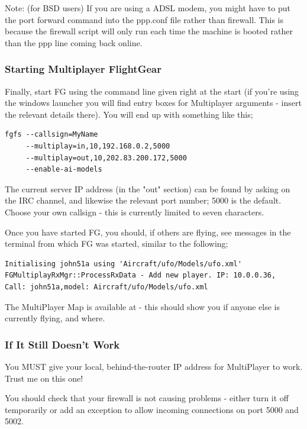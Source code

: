 Note: (for BSD users) If you are using a ADSL modem, you might have to put the port forward command into the ppp.conf 
file rather than firewall. This is because the firewall script will only run each time the machine is booted rather 
than the ppp line coming back online.

\subsubsection{Starting Multiplayer FlightGear}

Finally, start FG using the command line given right at the start (if you're using the windows launcher you will 
find entry boxes for Multiplayer arguments - insert the relevant details there). You will end up with something like this;

\begin{verbatim}
fgfs --callsign=MyName 
     --multiplay=in,10,192.168.0.2,5000   
     --multiplay=out,10,202.83.200.172,5000 
     --enable-ai-models
\end{verbatim}

The current server IP address (in the "out" section) can be found by asking on the IRC channel, and likewise the 
relevant port number; 5000 is the default. Choose your own callsign - this is currently limited to seven characters.

Once you have started FG, you should, if others are flying, see messages in the terminal from which FG was started, similar to the following;

\begin{verbatim}
Initialising john51a using 'Aircraft/ufo/Models/ufo.xml'  
FGMultiplayRxMgr::ProcessRxData - Add new player. IP: 10.0.0.36,  
Call: john51a,model: Aircraft/ufo/Models/ufo.xml 
\end{verbatim}

The MultiPlayer Map is available at  - 
this should show you if anyone else is currently flying, and where.

\subsubsection{If It Still Doesn't Work}

You MUST give your local, behind-the-router IP address for MultiPlayer to work. Trust me on this one!

You should check that your firewall is not causing problems - either turn it off temporarily or add an exception 
to allow incoming connections on port 5000 and 5002.

